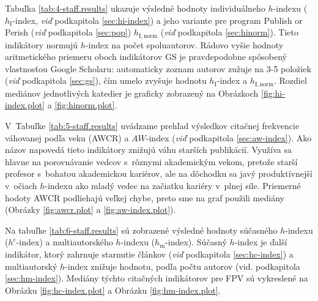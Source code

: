 Tabuľka \ref{tab:4-staff.results} ukazuje výsledné hodnoty individuálneho
$h$-indexu ($h_{\mathrm{I}}$-index, \emph{viď} podkapitola \ref{sec:hi-index}) a
jeho variante pre program Publish or Perish (\emph{viď} podkapitola
\ref{sec:pop}) $h_{\mathrm{I,norm}}$ (\emph{viď} podkapitola
\ref{sec:hinorm}). Tieto indikátory normujú $h$-index na počet
spoluautorov. Rádovo vyšie hodnoty aritmetického priemeru oboch indikátorov GS
je pravdepodobne spôsobený vlastnosťou Google Scholaru: automaticky zoznam
autorov zužuje na 3-5 položiek (\emph{viď} podkapitola \ref{sec:gs}), čím umelo
zvyšuje hodnotu $h_{\mathrm{I}}$-index a $h_{\mathrm{I,norm}}$.  Rozdiel
mediánov jednotlivých katedier je graficky zobrazený na Obrázkoch
\ref{fig:hi-index.plot} a \ref{fig:hinorm.plot}.

V~Tabuľke \ref{tab:5-staff.results} uvádzame prehľad výsledkov citačnej
frekvencie váhovanej podľa veku (AWCR) a $AW$-index (\emph{viď} podkapitola
\ref{sec:aw-index}). Ako názov napovedá tieto indikátory znižujú váhu starších
publikácií. Využíva sa hlavne na porovnávanie vedcov s~rôznymi akademickým
vekom, pretože starší profesor s~bohatou akademickou kariérov, ale na dôchodku
sa javý produktívnejší v~očiach $h$-indexu ako mladý vedec na začiatku kariéry
v~plnej sile. Priemerné hodoty AWCR podliehajú veľkej chybe, preto sme na graf
použili mediány (Obrázky \ref{fig:awcr.plot} a \ref{fig:aw-index.plot}).

Na tabuľke \ref{tab:6-staff.results} sú zobrazené výsledné hodnoty súčasného
$h$-indexu ($h^{\mathrm{c}}$-index) a multiautorského $h$-indexu
($h_{\mathrm{m}}$-index).  Súčasný $h$-index je ďalší indikátor, ktorý zahrnuje
starnutie článkov (\emph{viď} podkapitola \ref{sec:hc-index}) a multiautorský
$h$-index znižuje hodnotu, podľa počtu autorov (vid. podkapitola
\ref{sec:hm-index}).  Mediány týchto citačných indikátorov pre FPV sú vykreslené
na Obrázku \ref{fig:hc-index.plot} a Obrázku \ref{fig:hm-index.plot}.

